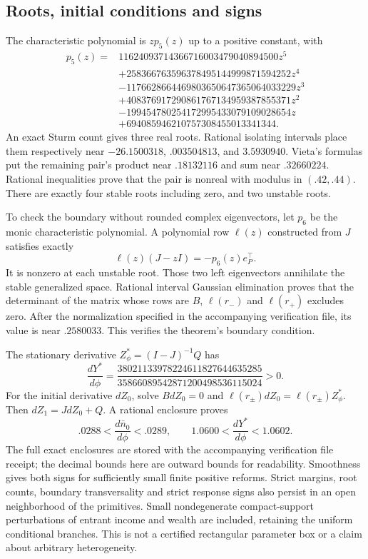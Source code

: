 \documentclass[
  11pt,
]{article}
\begin{document}
\subsection{Roots, initial conditions and
signs}\label{roots-initial-conditions-and-signs}

The characteristic polynomial is \(z p_5(z)\) up to a positive constant,
with \[
\begin{split}
p_5(z)={}&11624093714366716003479040894500z^5\\
&+258366763596378495144999871594252z^4\\
&-1176628664469803650647365064033229z^3\\
&+408376917290861767134959387855371z^2\\
&-199454780254172995433079109028654z\\
&+694085946210757308455013341344.
\end{split}
\] An exact Sturm count gives three real roots. Rational isolating
intervals place them respectively near \(-26.1500318\), \(.003504813\),
and \(3.5930940\). Vieta's formulas put the remaining pair's product
near \(.18132116\) and sum near \(.32660224\). Rational inequalities
prove that the pair is nonreal with modulus in \((.42,.44)\). There are
exactly four stable roots including zero, and two unstable roots.

To check the boundary without rounded complex eigenvectors, let \(p_6\)
be the monic characteristic polynomial. A polynomial row \(\ell(z)\)
constructed from \(J\) satisfies exactly \[
 \ell(z)(J-zI)=-p_6(z)e_P^\top.
\] It is nonzero at each unstable root. Those two left eigenvectors
annihilate the stable generalized space. Rational interval Gaussian
elimination proves that the determinant of the matrix whose rows are
\(B\), \(\ell(r_-)\) and \(\ell(r_+)\) excludes zero. After the
normalization specified in the accompanying verification file, its value
is near \(.2580033\). This verifies the theorem's boundary condition.

The stationary derivative \(Z_\phi^*=(I-J)^{-1}Q\) has \[
 \frac{dY^*}{d\phi}
 =\frac{38021133978224611827644635285}
 {35866089542871200498536115024}>0.
\] For the initial derivative \(dZ_0\), solve \(BdZ_0=0\) and
\(\ell(r_\pm)dZ_0=\ell(r_\pm)Z_\phi^*\). Then \(dZ_1=JdZ_0+Q\). A
rational enclosure proves \[
 .0288<\frac{d\bar n_0}{d\phi}<.0289,\qquad
 1.0600<\frac{dY^*}{d\phi}<1.0602.
\] The full exact enclosures are stored with the accompanying
verification file receipt; the decimal bounds here are outward bounds
for readability. Smoothness gives both signs for sufficiently small
finite positive reforms. Strict margins, root counts, boundary
transversality and strict response signs also persist in an open
neighborhood of the primitives. Small nondegenerate compact-support
perturbations of entrant income and wealth are included, retaining the
uniform conditional branches. This is not a certified rectangular
parameter box or a claim about arbitrary heterogeneity.
\end{document}
